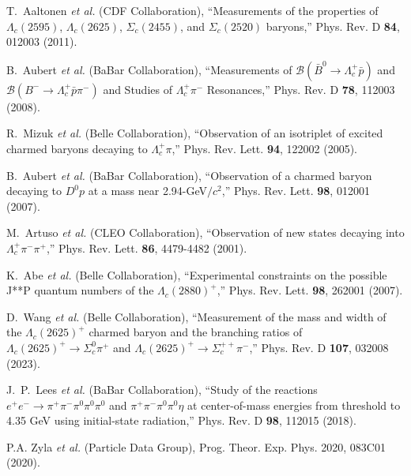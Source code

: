 \documentclass[a4paper, 12pt]{article}
\begin{document}
\clearpage
{}
{}
\begin{thebibliography}{99}%

    T.~Aaltonen \textit{et al.} (CDF Collaboration),
    ``Measurements of the properties of $\Lambda_c(2595)$, 
    $\Lambda_c(2625)$, $\Sigma_c(2455)$, and $\Sigma_c(2520)$ baryons,''
    Phys. Rev. D \textbf{84}, 012003 (2011).

    B.~Aubert \textit{et al.} (BaBar Collaboration),
    ``Measurements of $\mathcal{B}(\bar{B}^0 \to \Lambda_c^+ \bar{p})$ 
    and $\mathcal{B}(B^- \to \Lambda_c^+ \bar{p} \pi^-)$ and Studies of 
    $\Lambda_c^+ \pi^-$ Resonances,''
    Phys. Rev. D \textbf{78}, 112003 (2008).

    R.~Mizuk \textit{et al.} (Belle Collaboration),
    ``Observation of an isotriplet of excited charmed baryons decaying 
    to $\Lambda_c^+ \pi$,''
    Phys. Rev. Lett. \textbf{94}, 122002 (2005).

    B.~Aubert \textit{et al.} (BaBar Collaboration),
    ``Observation of a charmed baryon decaying to $D^0p$ at a mass near 
    2.94-GeV$/c^2$,''
    Phys. Rev. Lett. \textbf{98}, 012001 (2007).

    M.~Artuso \textit{et al.} (CLEO Collaboration),
    ``Observation of new states decaying into $\Lambda_c^+\pi^-\pi^+$,''
    Phys. Rev. Lett. \textbf{86}, 4479-4482 (2001).

    K.~Abe \textit{et al.} (Belle Collaboration),
    ``Experimental constraints on the possible J**P quantum numbers of 
    the $\Lambda_c(2880)^+$,''
    Phys. Rev. Lett. \textbf{98}, 262001 (2007).

    D.~Wang \textit{et al.} (Belle Collaboration),
    ``Measurement of the mass and width of the $\Lambda_c(2625)^+$ 
    charmed baryon and the branching ratios of $\Lambda_c(2625)^+ \to 
    \Sigma_c^0\pi^+$ and $\Lambda_c(2625)^+ \to \Sigma_c^{++}\pi^-$,''
    Phys. Rev. D \textbf{107}, 032008 (2023).

    J.~P.~Lees \textit{et al.} (BaBar Collaboration),
    ``Study of the reactions $e^+e^-\to\pi^+\pi^-\pi^0\pi^0\pi^0$ and 
    $\pi^+\pi^-\pi^0\pi^0\eta$ at center-of-mass energies from threshold 
    to 4.35 GeV using initial-state radiation,''
    Phys. Rev. D \textbf{98}, 112015 (2018).

    P.A. Zyla \textit{et al.} (Particle Data Group),
    Prog. Theor. Exp. Phys. 2020, 083C01 (2020).

\end{thebibliography}%
\end{document}
